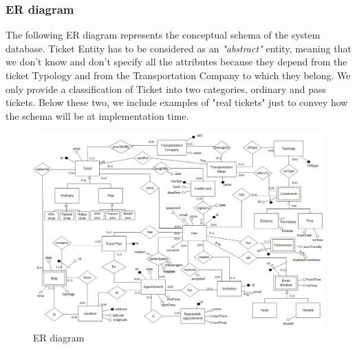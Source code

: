 	\subsubsection{ER diagram}
	The following ER diagram represents the conceptual schema of the system database. Ticket Entity has to be considered as an \textit{"abstract"} entity, meaning that we don't know and don't specify all the attributes because they depend from the ticket Typology and from the Transportation Company to which they belong. We only provide a classification of Ticket into two categories, ordinary and pass tickets. Below these two, we include examples of "real tickets" just to convey how the schema will be at implementation time.
	
    \begin{figure}[H]	
		\centerline{\includegraphics[width=0.9\paperwidth]{Images/ERdiagram}}
		\caption{ER diagram}
 	\end{figure}

	\filbreak

